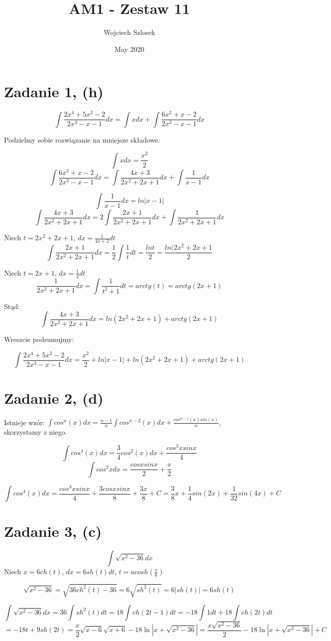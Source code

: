 \documentclass{article}
\title{AM1 - Zestaw 11}
\author{Wojciech Szlosek}
\date{May 2020}
\begin{document}
\maketitle

\section{Zadanie 1, (h)}

$$\int \frac{2x^4 + 5x^2 -2}{2x^3 - x - 1}dx = \int x dx + \int \frac{6x^2 + x - 2}{2x^3 -x -1}dx$$ \newline

Podzielmy sobie rozwiązanie na mniejsze składowe.

$$\int x dx = \frac{x^2}{2}$$
$$\int \frac{6x^2 +x -2}{2x^3 -x -1}dx = \int \frac{4x+3}{2x^2+2x+1}dx + \int \frac{1}{x-1}dx$$

$$\int \frac{1}{x-1}dx = ln|x-1|$$
$$\int \frac{4x+3}{2x^2 +2x+1}dx = 2\int \frac{2x+1}{2x^2 +2x+1}dx + \int \frac{1}{2x^2 +2x+1}dx$$ \newline

Niech $t = 2x^2 + 2x +1$, $dx = \frac{1}{4x+2}dt$
$$\int \frac{2x+1}{2x^2+2x+1}dx = \frac{1}{2} \int \frac{1}{t}dt = \frac{ln t}{2} = \frac{ln(2x^2 + 2x +1}{2}$$ \newline

Niech $t = 2x+1$, $dx = \frac{1}{2}dt$
$$\frac{1}{2x^2 +2x+1}dx = \int \frac{1}{t^2+1}dt = arctg(t) = arctg(2x+1)$$

Stąd:
$$\int \frac{4x+3}{2x^2+2x+1}dx = ln(2x^2 +2x+1)+arctg(2x+1)$$ \newline

Wreszcie podsumujmy: 

$$\int \frac{2x^4+5x^2-2}{2x^3-x-1}dx = \frac{x^2}{2}+ln|x-1| + ln(2x^2 +2x+1) + arctg(2x+1)$$


\section{Zadanie 2, (d)}

Istnieje wzór: $\int cos^{n}(x) dx = \frac{n-1}{n}\int cos^{n-2}(x)dx+\frac{cos^{n-1}(x)sin(x)}{n}$, skorzystamy z niego. 

$$\int cos^{4}(x) dx = \frac{3}{4}cos^{2}(x)dx + \frac{cos^{3}xsinx}{4}$$
$$\int cos^{2}x dx = \frac{cosxsinx}{2} + \frac{x}{2}$$ 

$$\int cos^4(x) dx = \frac{cos^{3}xsinx}{4}+\frac{3cosxsinx}{8}+\frac{3x}{8}+C = \frac{3}{8}x+\frac{1}{4}sin(2x)+\frac{1}{32}sin(4x)+C$$

\section{Zadanie 3, (c)}

$$\int \sqrt{x^2 -36} dx$$
Niech $x = 6ch(t)$, $dx = 6sh(t)dt$, $t = acosh(\frac{x}{6})$ \newline

$$\sqrt{x^2 -36} = \sqrt{36ch^{2}(t) -36} = 6\sqrt{sh^{2}(t)} = 6 |sh (t)| = 6sh(t)$$

$$\int \sqrt{x^{2}-36}dx = 36\int sh^{2}(t) dt = 18 \int ch(2t-1) dt = -18 \int 1dt + 18\int ch(2t) dt $$
$$ = -18t + 9sh(2t) = \frac{x}{2}\sqrt{x-6}\sqrt{x+6} - 18\ln|x+\sqrt{x^2-36}| = \frac{x\sqrt{x^2 -36}}{2}-18 \ln|x+\sqrt{x^2 -36}|+C$$
\end{document}

